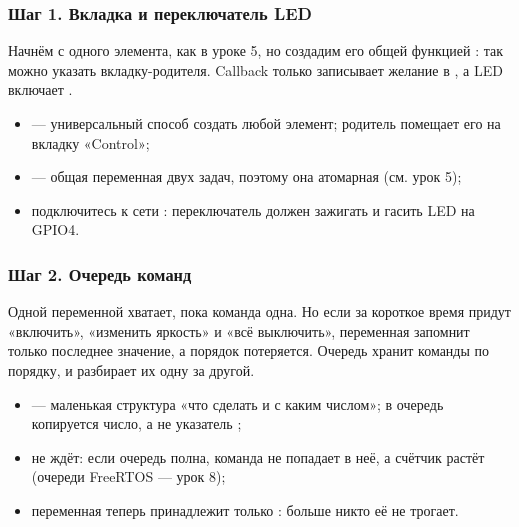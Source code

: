 \subsubsection{Шаг 1. Вкладка и переключатель LED}

Начнём с одного элемента, как в уроке 5, но создадим его общей функцией : так
можно указать вкладку-родителя. Callback только записывает желание в , а LED
включает .


\begin{itemize}[leftmargin=*]
  \item {} --- универсальный способ
        создать любой элемент; родитель  помещает его на вкладку «Control»;
  \item {} --- общая переменная двух задач, поэтому она атомарная (см. урок 5);
  \item подключитесь к сети : переключатель должен зажигать и гасить LED на GPIO4.
\end{itemize}

\subsubsection{Шаг 2. Очередь команд}

Одной переменной хватает, пока команда одна. Но если за короткое время придут «включить», «изменить
яркость» и «всё выключить», переменная запомнит только последнее значение, а порядок потеряется. Очередь
хранит команды по порядку, и  разбирает их одну за другой.


\begin{itemize}[leftmargin=*]
  \item {} --- маленькая структура «что сделать и с каким числом»; в очередь копируется число,
        а не указатель ;
  \item {} не ждёт: если очередь полна, команда не попадает в неё, а счётчик
         растёт (очереди FreeRTOS --- урок 8);
  \item переменная  теперь принадлежит только : больше никто её не трогает.
\end{itemize}

